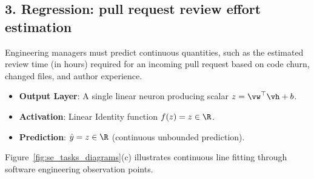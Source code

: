 \documentclass[../../main.tex]{subfiles}
\begin{document}
\subsection{3. Regression: pull request review effort estimation}
Engineering managers must predict continuous quantities, such as the estimated review time (in hours) required for an incoming pull request based on code churn, changed files, and author experience.
\begin{itemize}
    \item \textbf{Output Layer}: A single linear neuron producing scalar $z = \vw^\top \vh + b$.
    \item \textbf{Activation}: Linear Identity function $f(z) = z \in \R$.
    \item \textbf{Prediction}: $\hat{y} = z \in \R$ (continuous unbounded prediction).
\end{itemize}
Figure~\ref{fig:se_tasks_diagrams}(c) illustrates continuous line fitting through software engineering observation points.
\end{document}
